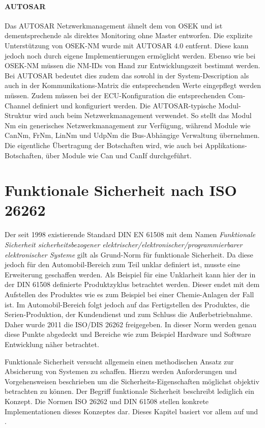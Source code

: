 \documentclass[
  a4paper,					    %
  twoside,
  DIV=calc,     				%
  bibliography=totoc,
  cleardoublepage=empty,
  ngerman,     					%
  final       					%
]{scrbook}
\begin{document}
\paragraph{AUTOSAR}
Das AUTOSAR Netzwerkmanagement ähnelt dem von OSEK und ist dementsprechende als direktes Monitoring ohne Master entworfen. Die explizite Unterstützung von OSEK-NM wurde mit AUTOSAR 4.0 entfernt. Diese kann jedoch noch durch eigene Implementierungen ermöglicht werden. Ebenso wie bei OSEK-NM müssen die NM-IDs von Hand zur Entwicklungszeit bestimmt werden. Bei AUTOSAR bedeutet dies zudem das sowohl in der System-Description als auch in der Kommunikations-Matrix die entsprechenden Werte eingepflegt werden müssen. Zudem müssen bei der ECU-Kon\-fi\-gu\-ra\-tion die entsprechenden Com-Channel definiert und konfiguriert werden. Die AUTOSAR-typische Modul-Struktur wird auch beim Netzwerkmanagement verwendet. So stellt das Modul Nm ein generisches Netzwerkmanagement zur Verfügung, während Module wie CanNm, FrNm, LinNm und UdpNm die Bus-Abhängige Verwaltung übernehmen. Die eigentliche Übertragung der Botschaften wird, wie auch bei Applikations-Botschaften, über Module wie Can und CanIf durchgeführt.\cite{ZimmermannSchmidgall201011}\cite{nm_fr}



\section{Funktionale Sicherheit nach ISO 26262}
\label{sec:Sicherheit}
Der seit 1998 existierende Standard DIN EN 61508 mit dem Namen \emph{Funktionale Sicherheit sicherheitsbezogener elektrischer/elektronischer/programmierbarer elektronischer Systeme} gilt als Grund-Norm für funktionale Sicherheit. Da diese jedoch für den Automobil-Bereich zum Teil unklar definiert ist, musste eine Erweiterung geschaffen werden. Als Beispiel für eine Unklarheit kann hier der in der DIN 61508 definierte Produktzyklus betrachtet werden. Dieser endet mit dem Aufstellen des Produktes wie es zum Beispiel bei einer Chemie-Anlagen der Fall ist. Im Automobil-Bereich folgt jedoch auf das Fertigstellen des Produktes, die Serien-Produktion, der Kundendienst und zum Schluss die Außerbetriebnahme. Daher wurde 2011 die ISO/DIS 26262 freigegeben. In dieser Norm werden genau diese Punkte abgedeckt und Bereiche wie zum Beispiel Hardware und Software Entwicklung näher betrachtet.

Funktionale Sicherheit versucht allgemein einen methodischen Ansatz zur Absicherung von Systemen zu schaffen. Hierzu werden Anforderungen und Vorgehensweisen beschrieben um die Sicherheits-Eigenschaften möglichst objektiv betrachten zu können. Der Begriff funktionale Sicherheit beschreibt lediglich ein Konzept. Die Normen ISO 26262 und DIN 61508 stellen konkrete Implementationen dieses Konzeptes dar. Dieses Kapitel basiert vor allem auf \cite{iso26262} und \cite{iso26262_robuste}.
\end{document}

